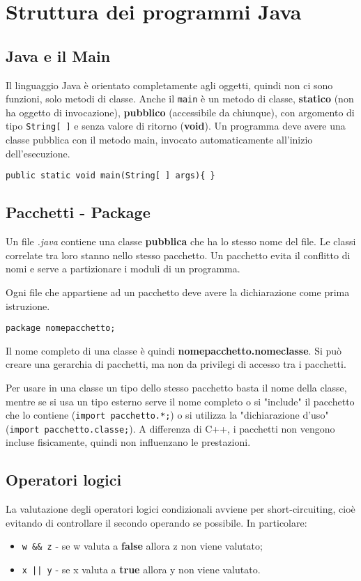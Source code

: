 \chapter{Struttura dei programmi Java}

\section{Java e il Main}
Il linguaggio Java è orientato completamente agli oggetti, quindi non ci sono funzioni, solo metodi di classe. Anche il \texttt{main} è un metodo di classe, \textbf{statico} (non ha oggetto di invocazione), \textbf{pubblico} (accessibile da chiunque), con argomento di tipo \texttt{String[ ]} e senza valore di ritorno (\textbf{void}).
Un programma deve avere una classe pubblica con il metodo main, invocato automaticamente all'inizio dell'esecuzione.
\begin{verbatim}
public static void main(String[ ] args){ }
\end{verbatim}

\section{Pacchetti - Package}
Un file \textit{.java} contiene una classe \textbf{pubblica} che ha lo stesso nome del file. Le classi correlate tra loro stanno nello stesso pacchetto. Un pacchetto evita il conflitto di nomi e serve a partizionare i moduli di un programma.

Ogni file che appartiene ad un pacchetto deve avere la dichiarazione come prima istruzione.
\begin{verbatim}
package nomepacchetto;
\end{verbatim}
Il nome completo di una classe è quindi \textbf{nomepacchetto.nomeclasse}.
Si può creare una gerarchia di pacchetti, ma non da privilegi di accesso tra i pacchetti.

Per usare in una classe un tipo dello stesso pacchetto basta il nome della classe, mentre se si usa un tipo esterno serve il nome completo o si "include" il pacchetto che lo contiene (\texttt{import pacchetto.*;}) o si utilizza la "dichiarazione d'uso" (\texttt{import pacchetto.classe;}). A differenza di C++, i pacchetti non vengono incluse fisicamente, quindi non influenzano le prestazioni.

\section{Operatori logici}
La valutazione degli operatori logici condizionali avviene per short-circuiting, cioè evitando di controllare il secondo operando se possibile. In particolare:
\begin{itemize}
\item \texttt{w \&\& z} - se w valuta a \textbf{false} allora z non viene valutato;
\item \texttt{x || y} - se x valuta a \textbf{true} allora y non viene valutato.
\end{itemize}

